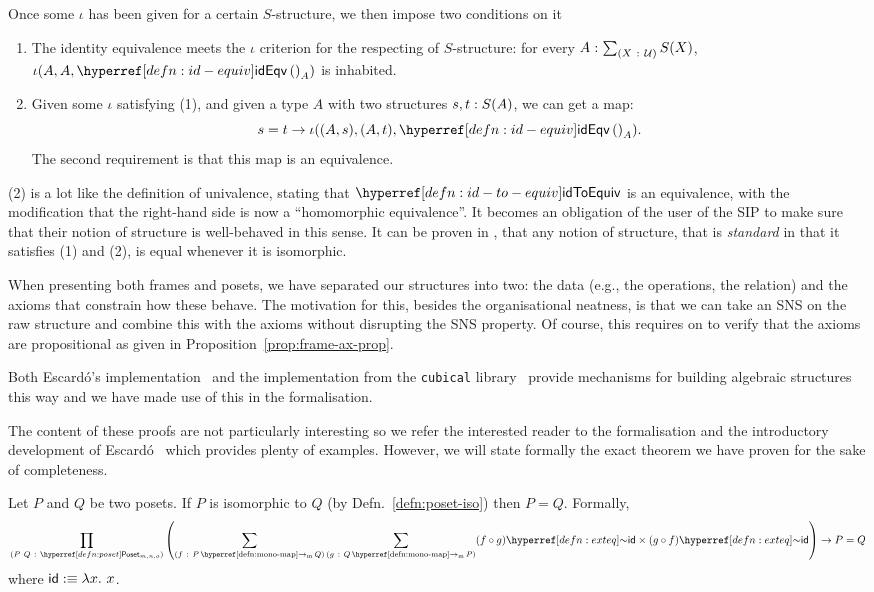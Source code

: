 Once some $\iota$ has been given for a certain $S$-structure, we then impose two conditions
on it
\begin{enumerate}
  \item The identity equivalence meets the $\iota$ criterion for the respecting of
    $S$-structure: for every $A\hspace{0.1mm}:\hspace{0.1mm}\sum_{(X~:~\mathcal{U}{})} S(X)$,
    $\iota(A, A, \idequiv{}_A)$ is inhabited.
  \item Given some $\iota$ satisfying (1), and given a type $A$ with two structures
    $s, t:S(A)$, we can get a map:
    \begin{equation*}
      s = t \rightarrow \iota((A, s), (A, t), \idequiv{}_A).
    \end{equation*}
    The second requirement is that this map is an equivalence.
\end{enumerate}

(2) is a lot like the definition of univalence, stating that $\idtoeqvnm{}$ is an
equivalence, with the modification that the right-hand side is now a ``homomorphic
equivalence''. It becomes an obligation of the user of the SIP to make sure that their
notion of structure is well-behaved in this sense. It can be proven in \UF{}, that any
notion of structure, that is \emph{standard} in that it satisfies (1) and (2), is equal
whenever it is isomorphic.

When presenting both frames and posets, we have separated our structures into two: the
data (e.g., the operations, the relation) and the axioms that constrain how these behave.
The motivation for this, besides the organisational neatness, is that we can take an SNS
on the raw structure and combine this with the axioms without disrupting the SNS property.
Of course, this requires on to verify that the axioms are propositional as given in
Proposition~\ref{prop:frame-ax-prop}.

Both Escard\'{o}'s implementation~\cite{escardo-uf-intro} and the implementation from the
\texttt{cubical} library~\cite{agda-cubical} provide mechanisms for building algebraic
structures this way and we have made use of this in the \veragda{} formalisation.

The content of these proofs are not particularly interesting so we refer the interested
reader to the \veragda{} formalisation and the introductory development of
Escardó~\cite{escardo-uf-intro} which provides plenty of examples. However, we will state
formally the exact theorem we have proven for the sake of completeness.

\begin{thm}
  Let $P$ and $Q$ be two posets. If $P$ is isomorphic to $Q$
  (by Defn.~\ref{defn:poset-iso}) then $P = Q$. Formally,
  \begin{equation*}
    \pity{P~Q}{\poset{}_{m, n, o}}{%
      \left(
        \sigmaty{f}{\mono{P}{Q}}{\sigmaty{g}{\mono{Q}{P}}{%
            \exteq{(f \circ g)}{\mathsf{id}} \times \exteq{(g \circ f)}{\mathsf{id}}
          }
        }
      \right)
      \rightarrow P = Q
    }
  \end{equation*}
  where $\mathsf{id} :\equiv \lambda x.~x$.
\end{thm}

